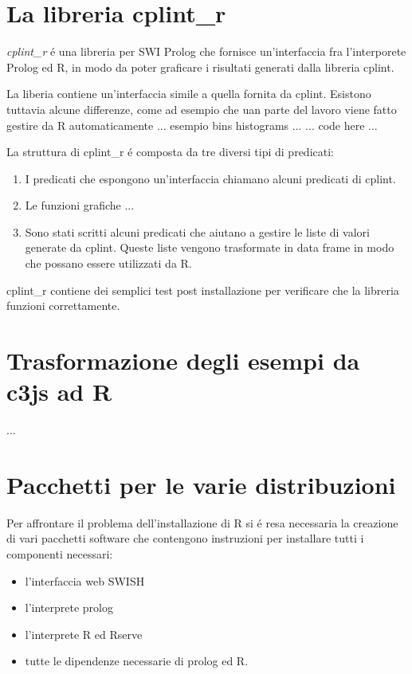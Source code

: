 \documentclass[10pt,titlepage,twoside,a4paper]{report}
\begin{document}
\chapter{La libreria cplint\_r} \label{la-libreria-cplint-r}
\emph{cplint\_r} \'e una libreria per SWI Prolog che fornisce un'interfaccia 
fra l'interporete Prolog ed R, in modo da poter graficare i risultati generati 
dalla libreria cplint.

La liberia contiene un'interfaccia simile a quella 
fornita da cplint. Esistono tuttavia alcune differenze, come ad esempio che uan 
parte del lavoro viene fatto gestire da R automaticamente ... esempio bins 
histograms ... ... code here ...

La struttura di cplint\_r \'e composta da tre diversi tipi di predicati:
\begin{enumerate}
    \item I predicati che espongono un'interfaccia chiamano alcuni predicati di 
          cplint.
    \item Le funzioni grafiche ...
    \item Sono stati scritti alcuni predicati che aiutano a gestire le liste di 
valori generate da cplint. Queste liste vengono trasformate in data frame in 
modo che possano essere utilizzati da R.
\end{enumerate}

cplint\_r contiene dei semplici test post installazione per verificare che la 
libreria funzioni correttamente.


\chapter{Trasformazione degli esempi da c3js ad R} \label{ch:trasformazione-
degli-esempi-da-c3js-ad-r}
...

\chapter{Pacchetti per le varie distribuzioni} \label{Pacchetti per le varie 
distribuzioni}
Per affrontare il problema dell'installazione di R si \'e resa necessaria la 
creazione di vari pacchetti software che contengono instruzioni per installare 
tutti i componenti necessari:
\begin{itemize}
    \item l'interfaccia web SWISH
    \item l'interprete prolog
    \item l'interprete R ed Rserve
    \item tutte le dipendenze necessarie di prolog ed R.
\end{itemize}
\end{document}
